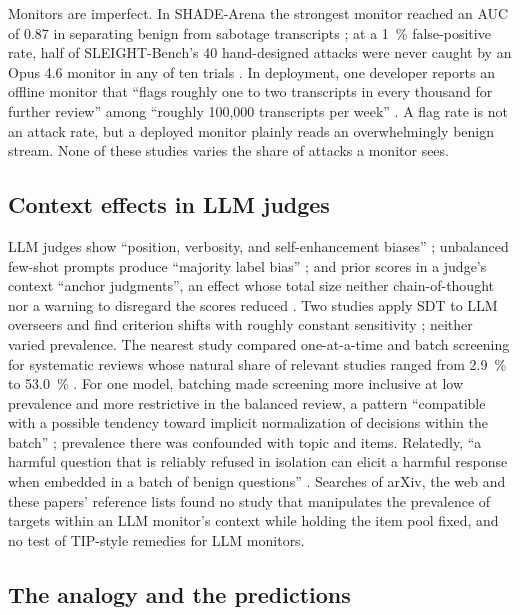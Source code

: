 \documentclass[10pt]{article}
\begin{document}
Monitors are imperfect. In SHADE-Arena the strongest monitor reached an AUC of 0.87 in separating benign from sabotage transcripts \citep[Sec.~4.1]{kutasov2025}; at a \SI{1}{\percent} false-positive rate, half of SLEIGHT-Bench's 40 hand-designed attacks were never caught by an Opus 4.6 monitor in any of ten trials \citep{najt2026,najt2026arxiv}. In deployment, one developer reports an offline monitor that ``flags roughly one to two transcripts in every thousand for further review'' among ``roughly 100,000 transcripts per week'' \citep{favaro_pace}. A flag rate is not an attack rate, but a deployed monitor plainly reads an overwhelmingly benign stream. None of these studies varies the share of attacks a monitor sees.

\subsection{Context effects in LLM judges}\label{sec:judges}

LLM judges show ``position, verbosity, and self-enhancement biases'' \citep[Abstract]{zheng2023}; unbalanced few-shot prompts produce ``majority label bias'' \citep[Fig.~4 caption]{zhao2021}; and prior scores in a judge's context ``anchor judgments'', an effect whose total size neither chain-of-thought nor a warning to disregard the scores reduced \citep[Abstract]{kapetanovic2026}. Two studies apply SDT to LLM overseers and find criterion shifts with roughly constant sensitivity \citep{chen2026,cai2026}; neither varied prevalence. The nearest study compared one-at-a-time and batch screening for systematic reviews whose natural share of relevant studies ranged from \SI{2.9}{\percent} to \SI{53.0}{\percent} \citep{hida2026}. For one model, batching made screening more inclusive at low prevalence and more restrictive in the balanced review, a pattern ``compatible with a possible tendency toward implicit normalization of decisions within the batch'' \citep[Sec.~4.4]{hida2026}; prevalence there was confounded with topic and items. Relatedly, ``a harmful question that is reliably refused in isolation can elicit a harmful response when embedded in a batch of benign questions'' \citep[Abstract]{kim2026}. Searches of arXiv, the web and these papers' reference lists found no study that manipulates the prevalence of targets within an LLM monitor's context while holding the item pool fixed, and no test of TIP-style remedies for LLM monitors.

\subsection{The analogy and the predictions}\label{sec:predictions}
\end{document}
